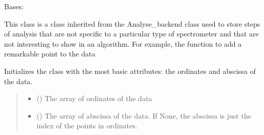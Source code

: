 \documentclass[letterpaper,10pt,english]{sphinxmanual}
\begin{document}
\begin{fulllineitems}
\label{\detokenize{source/_autosummary/HDF5_BLS_analyse.Analyse_general:HDF5_BLS_analyse.Analyse_general}}
\pysigstartsignatures
\pysiglinewithargsret
{}
{\sphinxparamcomma {}}
{}
\pysigstopsignatures
\sphinxAtStartPar
Bases: {\hyperref[\detokenize{source/_autosummary/HDF5_BLS_analyse.Analyse_backend:HDF5_BLS_analyse.Analyse_backend}]{}}

\sphinxAtStartPar
This class is a class inherited from the Analyse\_backend class used to store steps of analysis that are not specific to a particular type of spectrometer and that are not interesting to show in an algorithm. For example, the function to add a remarkable point to the data

\begin{fulllineitems}
\label{\detokenize{source/_autosummary/HDF5_BLS_analyse.Analyse_general:HDF5_BLS_analyse.Analyse_general.__init__}}
\pysigstartsignatures
\pysiglinewithargsret
{}
{\sphinxparamcomma {}}
{}
\pysigstopsignatures
\sphinxAtStartPar
Initializes the class with the most basic attributes: the ordinates and abscissa of the data.
\begin{quote}\begin{description}
\begin{itemize}
\item {} 
\sphinxAtStartPar
{} () \textendash{} The array of ordinates of the data

\item {} 
\sphinxAtStartPar
{} (\sphinxstyleliteralemphasis{\sphinxupquote{, }}) \textendash{} The array of abscissa of the data. If None, the abscissa is just the index of the points in ordinates.


\end{itemize}
\end{description}
\end{quote}
\end{fulllineitems}
\end{fulllineitems}
\end{document}
